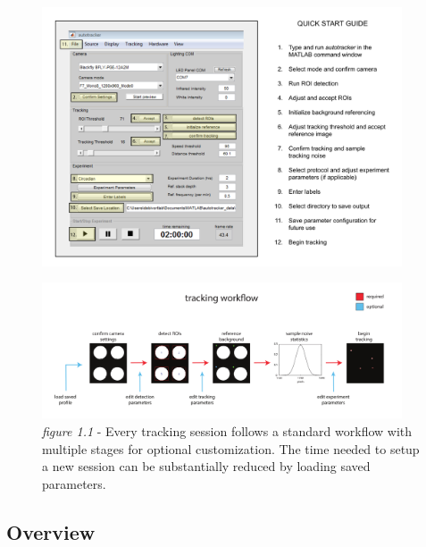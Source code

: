 \documentclass[11pt]{article}
\begin{document}
\begin{figure}[h!]
	\begin{center}
		\includegraphics[width=0.95\textwidth]{images/quickstart/quick_start_guide.pdf}
	\end{center}
\end{figure}

\begin{figure}[h!]
	\begin{center}
		\includegraphics[width=0.95\textwidth]{images/getting_started/tracking_workflow.pdf}
	\end{center}
	\caption*{\footnotesize {\textit{figure 1.1} - Every tracking session follows a standard workflow with multiple stages for optional customization. The time needed to setup a new session can be substantially reduced by loading saved parameters.}}
\end{figure}

\subsection{Overview}
\end{document}
